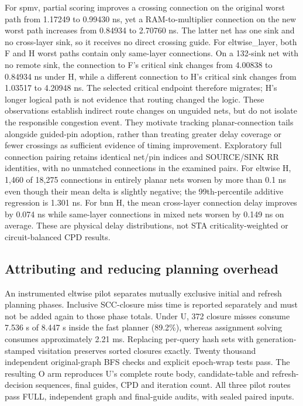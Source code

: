 \documentclass[conference,10pt]{IEEEtran}
\begin{document}
For spmv, partial scoring improves a crossing connection on the original worst path from 1.17249 to 0.99430 ns, yet a RAM-to-multiplier connection on the new worst path increases from 0.84934 to 2.70760 ns. The latter net has one sink and no cross-layer sink, so it receives no direct crossing guide. For eltwise\_layer, both F and H worst paths contain only same-layer connections. On a 132-sink net with no remote sink, the connection to F's critical sink changes from 4.00838 to 0.84934 ns under H, while a different connection to H's critical sink changes from 1.03517 to 4.20948 ns. The selected critical endpoint therefore migrates; H's longer logical path is not evidence that routing changed the logic. These observations establish indirect route changes on unguided nets, but do not isolate the responsible congestion event. They motivate tracking planar-connection tails alongside guided-pin adoption, rather than treating greater delay coverage or fewer crossings as sufficient evidence of timing improvement. Exploratory full connection pairing retains identical net/pin indices and SOURCE/SINK RR identities, with no unmatched connections in the examined pairs. For eltwise H, 1,460 of 18,275 connections in entirely planar nets worsen by more than 0.1 ns even though their mean delta is slightly negative; the 99th-percentile additive regression is 1.301 ns. For bnn H, the mean cross-layer connection delay improves by 0.074 ns while same-layer connections in mixed nets worsen by 0.149 ns on average. These are physical delay distributions, not STA criticality-weighted or circuit-balanced CPD results.


\subsection{Attributing and reducing planning overhead}
An instrumented eltwise pilot separates mutually exclusive initial and refresh planning phases. Inclusive SCC-closure miss time is reported separately and must not be added again to those phase totals. Under U, 372 closure misses consume 7.536 s of 8.447 s inside the fast planner (89.2\%), whereas assignment solving consumes approximately 2.21 ms. Replacing per-query hash sets with generation-stamped visitation preserves sorted closures exactly. Twenty thousand independent original-graph BFS checks and explicit epoch-wrap tests pass. The resulting O arm reproduces U's complete route body, candidate-table and refresh-decision sequences, final guides, CPD and iteration count. All three pilot routes pass FULL, independent graph and final-guide audits, with sealed paired inputs.
\end{document}
